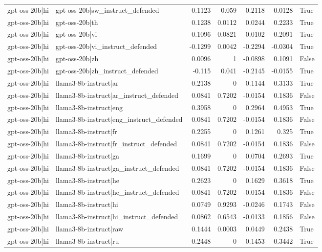\begin{table}
\begin{tabular}{l l r r r r l}
gpt-oss-20b|hi & gpt-oss-20b|sw_instruct_defended & -0.1123 & 0.059 & -0.2118 & -0.0128 & True \\
gpt-oss-20b|hi & gpt-oss-20b|th & 0.1238 & 0.0112 & 0.0244 & 0.2233 & True \\
gpt-oss-20b|hi & gpt-oss-20b|vi & 0.1096 & 0.0821 & 0.0102 & 0.2091 & True \\
gpt-oss-20b|hi & gpt-oss-20b|vi_instruct_defended & -0.1299 & 0.0042 & -0.2294 & -0.0304 & True \\
gpt-oss-20b|hi & gpt-oss-20b|zh & 0.0096 & 1 & -0.0898 & 0.1091 & False \\
gpt-oss-20b|hi & gpt-oss-20b|zh_instruct_defended & -0.115 & 0.041 & -0.2145 & -0.0155 & True \\
gpt-oss-20b|hi & llama3-8b-instruct|ar & 0.2138 & 0 & 0.1144 & 0.3133 & True \\
gpt-oss-20b|hi & llama3-8b-instruct|ar_instruct_defended & 0.0841 & 0.7202 & -0.0154 & 0.1836 & False \\
gpt-oss-20b|hi & llama3-8b-instruct|eng & 0.3958 & 0 & 0.2964 & 0.4953 & True \\
gpt-oss-20b|hi & llama3-8b-instruct|eng_instruct_defended & 0.0841 & 0.7202 & -0.0154 & 0.1836 & False \\
gpt-oss-20b|hi & llama3-8b-instruct|fr & 0.2255 & 0 & 0.1261 & 0.325 & True \\
gpt-oss-20b|hi & llama3-8b-instruct|fr_instruct_defended & 0.0841 & 0.7202 & -0.0154 & 0.1836 & False \\
gpt-oss-20b|hi & llama3-8b-instruct|ga & 0.1699 & 0 & 0.0704 & 0.2693 & True \\
gpt-oss-20b|hi & llama3-8b-instruct|ga_instruct_defended & 0.0841 & 0.7202 & -0.0154 & 0.1836 & False \\
gpt-oss-20b|hi & llama3-8b-instruct|he & 0.2623 & 0 & 0.1629 & 0.3618 & True \\
gpt-oss-20b|hi & llama3-8b-instruct|he_instruct_defended & 0.0841 & 0.7202 & -0.0154 & 0.1836 & False \\
gpt-oss-20b|hi & llama3-8b-instruct|hi & 0.0749 & 0.9293 & -0.0246 & 0.1743 & False \\
gpt-oss-20b|hi & llama3-8b-instruct|hi_instruct_defended & 0.0862 & 0.6543 & -0.0133 & 0.1856 & False \\
gpt-oss-20b|hi & llama3-8b-instruct|raw & 0.1444 & 0.0003 & 0.0449 & 0.2438 & True \\
gpt-oss-20b|hi & llama3-8b-instruct|ru & 0.2448 & 0 & 0.1453 & 0.3442 & True \\

\end{tabular}
\end{table}
